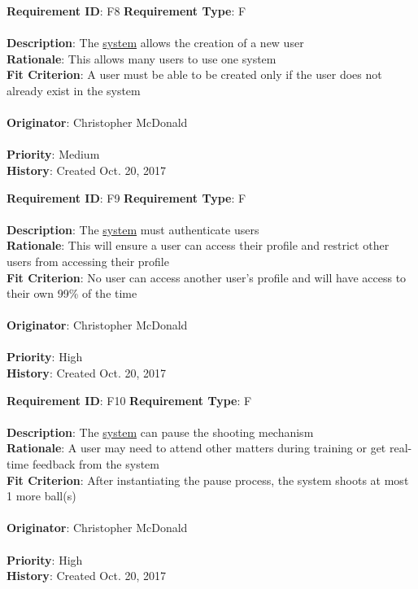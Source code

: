 \documentclass[11pt]{article}
\begin{document}
\begin{framed}
	\noindent\textbf{Requirement ID}: F8 \hfill \textbf{Requirement Type}: F \hfill\\\\
	\noindent\textbf{Description}: The \hyperref[sec:definitions]{system} allows the creation of a new user \\
	\textbf{Rationale}: This allows many users to use one system \\
	\textbf{Fit Criterion}: A user must be able to be created only if the user does not already exist in the system \\\\
	\textbf{Originator}: Christopher McDonald \\\\
	\textbf{Priority}: Medium \hfill \\
	\noindent\textbf{History}: Created Oct. 20, 2017
\end{framed}

\begin{framed}
	\noindent\textbf{Requirement ID}: F9 \hfill \textbf{Requirement Type}: F \hfill\\\\
	\noindent\textbf{Description}: The \hyperref[sec:definitions]{system} must authenticate users \\
	\textbf{Rationale}: This will ensure a user can access their profile and restrict other users from accessing their profile \\
	\textbf{Fit Criterion}: No user can access another user's profile and will have access to their own 99\% of the time \\\\
	\textbf{Originator}: Christopher McDonald \\\\
	\textbf{Priority}: High \hfill \\
	\noindent\textbf{History}: Created Oct. 20, 2017
\end{framed}

\begin{framed}
	\noindent\textbf{Requirement ID}: F10 \hfill \textbf{Requirement Type}: F \hfill\\\\
	\noindent\textbf{Description}: The \hyperref[sec:definitions]{system} can pause the shooting mechanism \\
	\textbf{Rationale}: A user may need to attend other matters during training or get real-time feedback from the system \\
	\textbf{Fit Criterion}: After instantiating the pause process, the system shoots at most 1 more ball(s) \\\\
	\textbf{Originator}: Christopher McDonald \\\\
	\textbf{Priority}: High \hfill \\
	\noindent\textbf{History}: Created Oct. 20, 2017
\end{framed}
\end{document}
